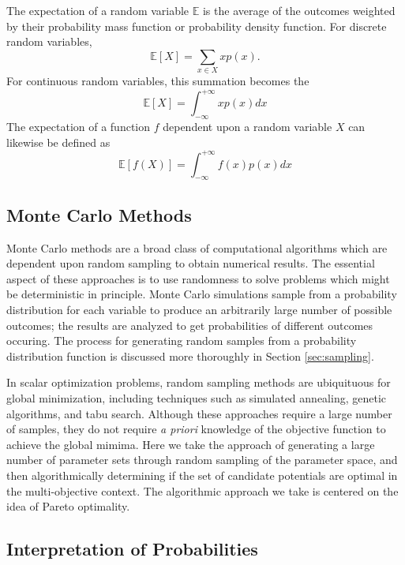  The expectation of a random variable $\mathbb{E}$ is the average of the outcomes weighted by their probability mass function or probability density function.  For discrete random variables,
 \begin{equation}
	 \mathbb{E}[X] = \sum_{x\in X} x p(x).
	\end{equation}
For continuous random variables, this summation becomes the
\begin{equation}
	\mathbb{E}[X] = \int_{-\infty}^{+\infty} x p(x) dx
\end{equation}
The expectation of a function $f$ dependent upon a random variable $X$ can likewise be defined as
\begin{equation}
	\mathbb{E}[f(X)] = \int_{-\infty}^{+\infty} f(x) p(x) dx
\end{equation}
\subsection{Monte Carlo Methods}
Monte Carlo methods\cite{thomopoulos2013_montecarlo} are a broad class of computational algorithms which are dependent upon random sampling to obtain numerical results.
The essential aspect of these approaches is to use randomness to solve problems which might be deterministic in principle.
Monte Carlo simulations sample from a probability distribution for each variable to produce an arbitrarily large number of possible outcomes; the results are analyzed to get probabilities of different outcomes occuring.  The process for generating random samples from a probability distribution function is discussed more thoroughly in Section \ref{sec:sampling}.

In scalar optimization problems, random sampling methods are ubiquituous for global minimization, including techniques such as simulated annealing\cite{kirkpatrick1983_simmulated_annealing}, genetic algorithms\cite{holland1975_ga}, and tabu search\cite{glover1986_tabu}.  Although these approaches require a large number of samples, they do not require \emph{a priori} knowledge of the objective function to achieve the global mimima.
Here we take the approach of generating a large number of parameter sets through random sampling of the parameter space, and then algorithmically determining if the set of candidate potentials are optimal in the multi-objective context.  The algorithmic approach we take is centered on the idea of Pareto optimality.

\subsection{Interpretation of Probabilities}

